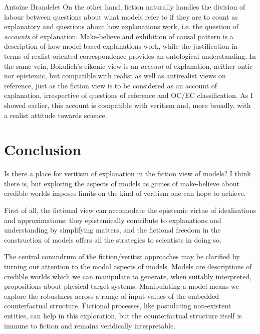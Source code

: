\begin{artengenv}{Antoine Brandelet}
On the other hand, fiction naturally handles the division of labour between questions about what models refer to if they are to count as explanatory and questions about how explanations work, i.e. the question of \textit{accounts} of explanation. Make-believe and exhibition of causal pattern is a description of how model-based explanations work, while the justification in terms of realist-oriented correspondence provides an ontological understanding. In the same vein, Bokulich's eikonic view is an \textit{account} of explanation, neither ontic nor epistemic, but compatible with realist as well as antirealist views on reference, just as the fiction view is to be considered as an account of explanation, irrespective of questions of reference and OC/EC classification. As I showed earlier, this account is compatible with veritism and, more broadly, with a realist attitude towards science.



\section{Conclusion}\label{sec:conclusion}


Is there a place for veritism of explanation in the fiction view of models? I think there is, but exploring the aspects of models as games of make-believe about credible worlds imposes limits on the kind of veritism one can hope to achieve.

First of all, the fictional view can accomodate the epistemic virtue of idealisations and approximations: they epistemically contribute to explanations and understanding by simplifying matters, and the fictional freedom in the construction of models offers all the strategies to scientists in doing so.

The central conundrum of the fiction/veritist approaches may be clarified by turning our attention to the modal aspects of models. Models are descriptions of credible worlds which we can manipulate to generate, when suitably interpreted, propositions about physical target systems. Manipulating a model means we explore the robustness across a range of input values of the embedded counterfactual structure. Fictional processes, like postulating non-existent entities, can help in this exploration, but the counterfactual structure itself is immune to fiction and remains veridically interpretable.


\end{artengenv}
